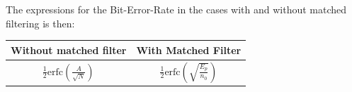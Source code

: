 \begin{refsection}

%
%


%



The expressions for the Bit-Error-Rate in the cases with and without matched filtering is then:

\begin{table}[H]
	\centering
	\begin{tabulary}{1.0\textwidth}{|c|c|}
		\hline
		\textbf{Without matched filter} 								& \textbf{With Matched Filter} \\ \hline
		$ \frac{1}{2} \text{erfc} \left( \frac{A}{\sqrt{N}} \right) $	& $ \frac{1}{2} \text{erfc} \left( \sqrt{\frac{E_p}{{n_0}}} \right) $ \\ \hline
	\end{tabulary}
	

\end{table}
\end{refsection}
